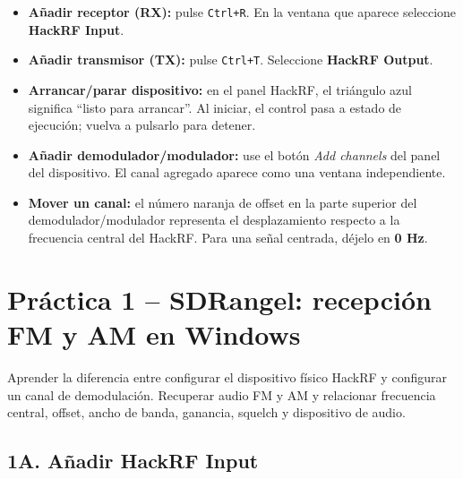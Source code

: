 \begin{itemize}
    \item \textbf{Añadir receptor (RX):} pulse \texttt{Ctrl+R}. En la ventana que aparece seleccione \textbf{HackRF Input}.
    \item \textbf{Añadir transmisor (TX):} pulse \texttt{Ctrl+T}. Seleccione \textbf{HackRF Output}.
    \item \textbf{Arrancar/parar dispositivo:} en el panel HackRF, el triángulo azul significa ``listo para arrancar''. Al iniciar, el control pasa a estado de ejecución; vuelva a pulsarlo para detener.
    \item \textbf{Añadir demodulador/modulador:} use el botón \emph{Add channels} del panel del dispositivo. El canal agregado aparece como una ventana independiente.
    \item \textbf{Mover un canal:} el número naranja de offset en la parte superior del demodulador/modulador representa el desplazamiento respecto a la frecuencia central del HackRF. Para una señal centrada, déjelo en \textbf{0 Hz}.
\end{itemize}

\clearpage
\section{Práctica 1 -- SDRangel: recepción FM y AM en Windows}

\begin{objetivo}
Aprender la diferencia entre configurar el dispositivo físico HackRF y configurar un canal de demodulación. Recuperar audio FM y AM y relacionar frecuencia central, offset, ancho de banda, ganancia, squelch y dispositivo de audio.
\end{objetivo}

\subsection{1A. Añadir HackRF Input}


